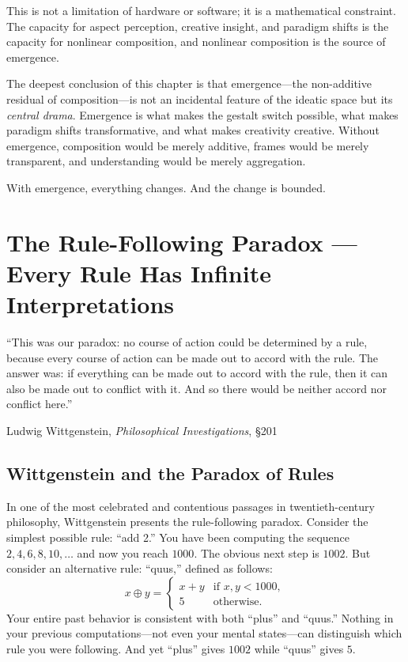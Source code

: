 This is not a limitation of hardware or software; it is a
mathematical constraint.  The capacity for aspect perception, creative
insight, and paradigm shifts is the capacity for nonlinear composition,
and nonlinear composition is the source of emergence.

The deepest conclusion of this chapter is that emergence---the
non-additive residual of composition---is not an incidental feature
of the ideatic space but its \emph{central drama}.  Emergence is what
makes the gestalt switch possible, what makes paradigm shifts
transformative, and what makes creativity creative.  Without
emergence, composition would be merely additive, frames would be
merely transparent, and understanding would be merely aggregation.

With emergence, everything changes.  And the change is bounded.



\chapter{The Rule-Following Paradox --- Every Rule Has Infinite Interpretations}
\label{ch:rule-following}

\epigraph{``This was our paradox: no course of action could be
determined by a rule, because every course of action can be made out to
accord with the rule.  The answer was: if everything can be made out to
accord with the rule, then it can also be made out to conflict with it.
And so there would be neither accord nor conflict here.''}{Ludwig Wittgenstein, \textit{Philosophical Investigations}, \S 201}

\section{Wittgenstein and the Paradox of Rules}

In one of the most celebrated and contentious passages in twentieth-century
philosophy, Wittgenstein presents the rule-following paradox.  Consider
the simplest possible rule: ``add 2.''  You have been computing the
sequence $2, 4, 6, 8, 10, \ldots$ and now you reach $1000$.  The obvious
next step is $1002$.  But consider an alternative rule: ``quus,'' defined
as follows:
\[
x \oplus y = \begin{cases}
x + y & \text{if } x, y < 1000, \\
5 & \text{otherwise.}
\end{cases}
\]
Your entire past behavior is consistent with both ``plus'' and ``quus.''
Nothing in your previous computations---not even your mental states---can
distinguish which rule you were following.  And yet ``plus'' gives $1002$
while ``quus'' gives $5$.

